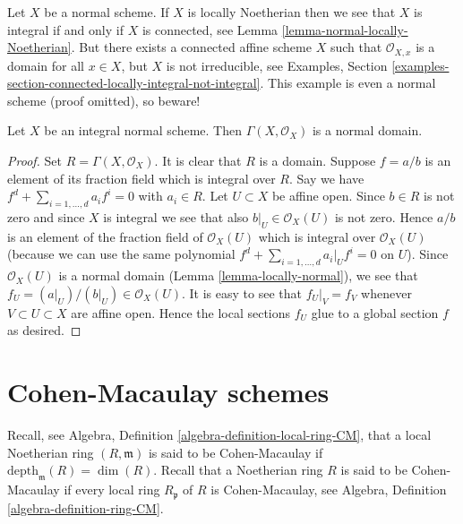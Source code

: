 \begin{remark}
\label{remark-normal-connected-irreducible}
Let $X$ be a normal scheme. If $X$ is locally Noetherian then we see that
$X$ is integral if and only if $X$ is connected, see
Lemma \ref{lemma-normal-locally-Noetherian}.
But there exists a connected affine scheme $X$ such that
$\mathcal{O}_{X, x}$ is a domain for all $x \in X$, but $X$ is not
irreducible, see Examples, Section
\ref{examples-section-connected-locally-integral-not-integral}.
This example is even a normal scheme (proof omitted), so beware!
\end{remark}

\begin{lemma}
\label{lemma-normal-integral-sections}
Let $X$ be an integral normal scheme.
Then $\Gamma(X, \mathcal{O}_X)$ is a normal domain.
\end{lemma}

\begin{proof}
Set $R = \Gamma(X, \mathcal{O}_X)$.
It is clear that $R$ is a domain.
Suppose $f = a/b$ is an element of its fraction field
which is integral over $R$. Say we have
$f^d + \sum_{i = 1, \ldots, d} a_i f^i = 0$ with
$a_i \in R$. Let $U \subset X$ be affine open.
Since $b \in R$ is not zero and since $X$ is integral we see
that also $b|_U \in \mathcal{O}_X(U)$ is not zero.
Hence $a/b$ is an element of the fraction field of
$\mathcal{O}_X(U)$ which is integral over $\mathcal{O}_X(U)$
(because we can use the same polynomial
$f^d + \sum_{i = 1, \ldots, d} a_i|_U f^i = 0$ on $U$).
Since $\mathcal{O}_X(U)$ is a normal domain
(Lemma \ref{lemma-locally-normal}), we see that
$f_U = (a|_U)/(b|_U) \in \mathcal{O}_X(U)$. It is easy to
see that $f_U|_V = f_V$ whenever $V \subset U \subset X$ are
affine open. Hence the local sections $f_U$ glue to a global
section $f$ as desired.
\end{proof}










\section{Cohen-Macaulay schemes}
\label{section-Cohen-Macaulay}

\noindent
Recall, see Algebra, Definition \ref{algebra-definition-local-ring-CM},
that a local Noetherian ring $(R, \mathfrak m)$ is
said to be Cohen-Macaulay if $\text{depth}_{\mathfrak m}(R) = \dim(R)$.
Recall that a Noetherian ring $R$ is said to be Cohen-Macaulay if
every local ring $R_{\mathfrak p}$ of $R$ is Cohen-Macaulay,
see Algebra, Definition \ref{algebra-definition-ring-CM}.

